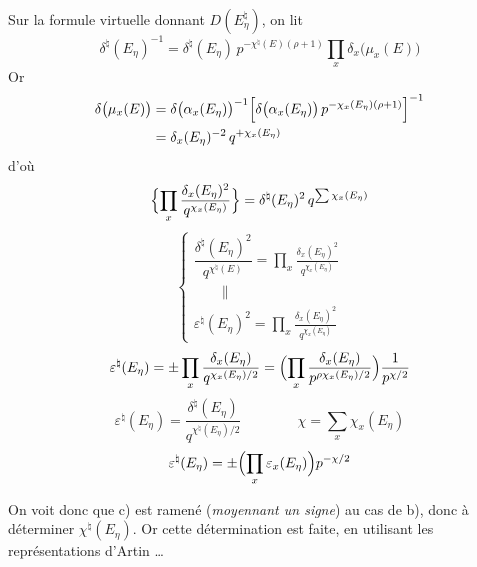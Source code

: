 \documentclass[11pt,a4paper]{article}
\begin{document}
Sur la formule virtuelle donnant $D(E_\eta^{\natural})$, on lit
\[
  \delta^{\natural}(E_\eta)^{-1} = \delta^{\natural}(E_\eta)\,
    p^{-\chi^{\natural}(E)(\rho+1)} \prod_x \delta_x\bigl(\mu_x(E)\bigr)
\]
Or
\[
  \begin{aligned}
    \delta\bigl(\mu_x(E)\bigr) &= \delta\bigl(\alpha_x(E_\eta)\bigr)^{-1}
      \Bigl[\delta\bigl(\alpha_x(E_\eta)\bigr)\, p^{-\chi_x(E_\eta)(\rho+1)}\Bigr]^{-1} \\
    &= \delta_x(E_\eta)^{-2}\, q^{+\chi_x(E_\eta)}
  \end{aligned}
\]
d'où
\[
  \Bigl\lbrace \prod_x \frac{\delta_x(E_\eta)^2}{q^{\chi_x(E_\eta)}} \Bigr\rbrace
  = \delta^{\natural}(E_\eta)^2\, q^{\sum \chi_x(E_\eta)}
\]
\[
  \left\lbrace
  \begin{array}{l}
    \dfrac{\delta^{\natural}(E_\eta)^2}{q^{\chi^{\natural}(E)}}
      = \displaystyle\prod_x \frac{\delta_x(E_\eta)^2}{q^{\chi_x(E_\eta)}} \\[14pt]
    \qquad \parallel \\[2pt]
    \varepsilon^{\natural}(E_\eta)^2
      = \displaystyle\prod_x \frac{\delta_x(E_\eta)^2}{q^{\chi_x(E_\eta)}}
  \end{array}
  \right.
\]
\[
  \varepsilon^{\natural}(E_\eta)
  = \pm \prod_x \frac{\delta_x(E_\eta)}{q^{\chi_x(E_\eta)/2}}
  = \Bigl(\prod_x \frac{\delta_x(E_\eta)}{p^{\rho\chi_x(E_\eta)/2}}\Bigr) \frac{1}{p^{\chi/2}}
\]
\[
  \varepsilon^{\natural}(E_\eta) = \frac{\delta^{\natural}(E_\eta)}{q^{\chi^{\natural}(E_\eta)/2}}
  \qquad\qquad
  \chi = \sum_x \chi_x(E_\eta)
\]
\[
  \varepsilon^{\natural}(E_\eta) = \pm \Bigl(\prod_x \varepsilon_x(E_\eta)\Bigr) p^{-\chi/2}
\]

On voit donc que c) est ramené (\emph{moyennant un signe}) au cas de b),
donc à déterminer $\chi^{\natural}(E_\eta)$. Or cette détermination est
faite, en utilisant les représentations d'Artin \ldots
{}
\end{document}
